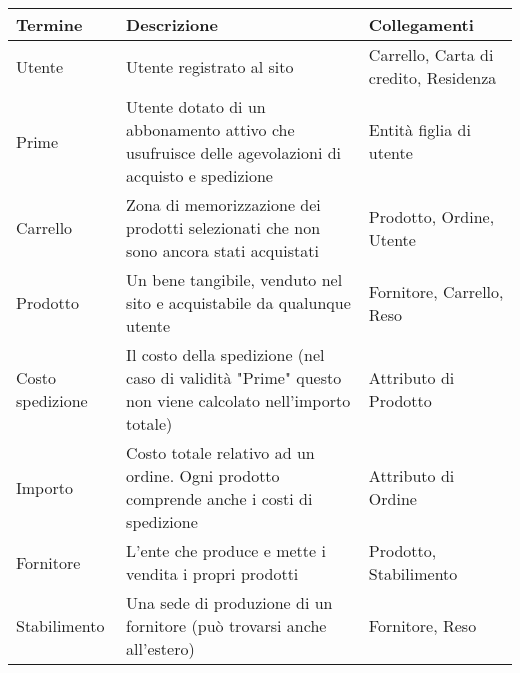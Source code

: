 \documentclass[11pt]{article}
\begin{document}
\begin{center}
    
    \begin{tabularx}{0.98\textwidth} {
        | >{\raggedright\arraybackslash}X |
          >{\raggedright\arraybackslash}X |
          >{\raggedright\arraybackslash}X |
    }
        \hline
        \textbf{Termine} & \textbf{Descrizione} & \textbf{Collegamenti} \\
        \hline\hline

        Utente &
        Utente registrato al sito &
        Carrello, Carta di credito, Residenza \\ 
        \hline

        Prime &
        Utente dotato di un abbonamento attivo che usufruisce delle agevolazioni di acquisto e spedizione &
        Entità figlia di utente \\ 
        \hline

        Carrello &
        Zona di memorizzazione dei prodotti selezionati che non sono ancora stati acquistati  &
        Prodotto, Ordine, Utente\\
        \hline

        Prodotto &
        Un bene tangibile, venduto nel sito e acquistabile da qualunque utente &
        Fornitore, Carrello, Reso\\
        \hline

        Costo spedizione &
        Il costo della spedizione (nel caso di validità "Prime" questo non viene calcolato nell'importo totale) &
        Attributo di Prodotto\\
        \hline

        Importo &
        Costo totale relativo ad un ordine. Ogni prodotto comprende anche i costi di spedizione &
        Attributo di Ordine \\ 
        \hline

        Fornitore &
        L'ente che produce e mette i vendita i propri prodotti &
        Prodotto, Stabilimento \\ 
        \hline

        Stabilimento &
        Una sede di produzione di un fornitore (può trovarsi anche all'estero) &
        Fornitore, Reso \\ 
        \hline
        

\end{tabularx}
\end{center}
\end{document}
